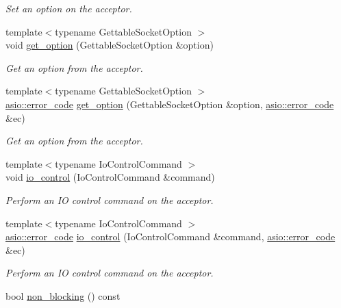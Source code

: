 \begin{DoxyCompactItemize}
\begin{DoxyCompactList}\small\item\em Set an option on the acceptor. \end{DoxyCompactList}\item 
{\footnotesize template$<$typename Gettable\+Socket\+Option $>$ }\\void \hyperlink{classasio_1_1basic__socket__acceptor_a5a274dff9d5b75150867eff8b070283e}{get\+\_\+option} (Gettable\+Socket\+Option \&option)
\begin{DoxyCompactList}\small\item\em Get an option from the acceptor. \end{DoxyCompactList}\item 
{\footnotesize template$<$typename Gettable\+Socket\+Option $>$ }\\\hyperlink{classasio_1_1error__code}{asio\+::error\+\_\+code} \hyperlink{classasio_1_1basic__socket__acceptor_abccf8b934268a074949f3a19c0d3045d}{get\+\_\+option} (Gettable\+Socket\+Option \&option, \hyperlink{classasio_1_1error__code}{asio\+::error\+\_\+code} \&ec)
\begin{DoxyCompactList}\small\item\em Get an option from the acceptor. \end{DoxyCompactList}\item 
{\footnotesize template$<$typename Io\+Control\+Command $>$ }\\void \hyperlink{classasio_1_1basic__socket__acceptor_aae144bb726ef14f02bdc34e306db02ed}{io\+\_\+control} (Io\+Control\+Command \&command)
\begin{DoxyCompactList}\small\item\em Perform an I\+O control command on the acceptor. \end{DoxyCompactList}\item 
{\footnotesize template$<$typename Io\+Control\+Command $>$ }\\\hyperlink{classasio_1_1error__code}{asio\+::error\+\_\+code} \hyperlink{classasio_1_1basic__socket__acceptor_a9a209abb65b5737261eb805be60550ea}{io\+\_\+control} (Io\+Control\+Command \&command, \hyperlink{classasio_1_1error__code}{asio\+::error\+\_\+code} \&ec)
\begin{DoxyCompactList}\small\item\em Perform an I\+O control command on the acceptor. \end{DoxyCompactList}\item 
bool \hyperlink{classasio_1_1basic__socket__acceptor_a7bd4a093091d2b8aeae05860e92750b4}{non\+\_\+blocking} () const 

\end{DoxyCompactItemize}
